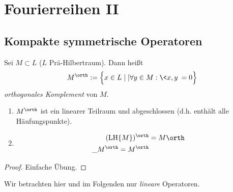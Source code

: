 
\chapter{Fourierreihen II}

\section{Kompakte symmetrische Operatoren}


\begin{df} \label{3.1}
	Sei $M \subset L$ ($L$ Prä-Hilbertraum).
	Dann heißt
	\[
		M^\orth := \Big\{ x \in L \mid| \forall y \in M : \<x,y\> = 0 \Big\}
	\]
	\emph{orthogonales Komplement} von $M$.
\end{df}

\begin{st} \label{3.2}
	\begin{enumerate}[1)]
		\item
			$M^\orth$ ist ein linearer Teilraum und abgeschlossen (d.h. enthält alle Häufungspunkte).
		\item
			\begin{align*}
				(\LH \{M\})^\orth &= M\orth \\
				\_M^\orth = M^\orth
			\end{align*}
	\end{enumerate}
	\begin{proof}
		Einfache Übung.
	\end{proof}
\end{st}

\begin{conv*}
	Wir betrachten hier und im Folgenden nur \emph{lineare} Operatoren.
\end{conv*}


